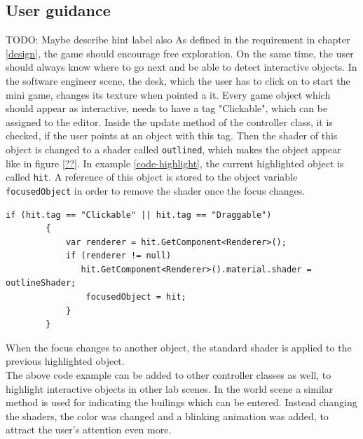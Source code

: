 \subsection{User guidance}
TODO: Maybe describe hint label also
As defined in the requirement in chapter \ref{design}, the game should encourage free exploration. On the same time, the user should always know where to go next and be able to detect interactive objects. In the software engineer scene, the desk, which the user has to click on to start the mini game, changes its texture when pointed a it.
Every game object which should appear as interactive, needs to have a  tag "Clickable", which can be assigned to the editor. Inside the update method of the controller class, it is checked, if the user points at an object with this tag. Then the shader of this object is changed to a shader called \texttt{outlined}, which makes the object appear like in figure \ref{??}. In example \ref{code-highlight}, the current highlighted object is called \texttt{hit}. A reference of this object is stored to the object variable \texttt{focusedObject} in order to remove the shader once the focus changes.
\begin{lstlisting} 
if (hit.tag == "Clickable" || hit.tag == "Draggable")
        {
            var renderer = hit.GetComponent<Renderer>();
            if (renderer != null)
               hit.GetComponent<Renderer>().material.shader = outlineShader;
                focusedObject = hit;
            }
        }
\end{lstlisting} 
\label{code-highlight}
When the focus changes to another object, the standard shader is applied to the previous highlighted object.\\
The above code example can be added to other controller classes as well, to highlight interactive objects in other lab scenes. In the world scene a similar method is used for indicating the builings which can be entered. Instead changing the shaders, the color was changed and a blinking animation was added, to attract the user's attention even more.
